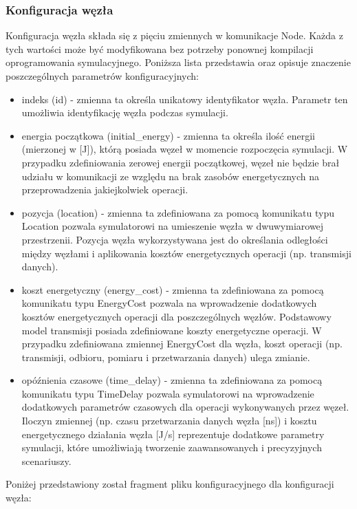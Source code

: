 \documentclass[a4paper,12pt,twoside,openany]{report}
\begin{document}
\subsubsection{Konfiguracja węzła}

Konfiguracja węzła składa się z pięciu zmiennych w komunikacje Node. Każda z tych wartości może być modyfikowana bez potrzeby
ponownej kompilacji oprogramowania symulacyjnego. Poniższa lista przedstawia oraz opisuje znaczenie poszczególnych parametrów konfiguracyjnych:

\begin{itemize}
 \item indeks (id) - zmienna ta określa unikatowy identyfikator węzła. Parametr ten umożliwia identyfikację węzła podczas symulacji.
 \item energia początkowa (initial\_energy) - zmienna ta określa ilość energii (mierzonej w [J]), którą posiada węzeł w momencie rozpoczęcia symulacji.
       W przypadku zdefiniowania zerowej energii początkowej, węzeł nie będzie brał udziału w komunikacji ze względu na brak zasobów energetycznych na
       przeprowadzenia jakiejkolwiek operacji.
 \item pozycja (location) - zmienna ta zdefiniowana za pomocą komunikatu typu Location pozwala symulatorowi na umieszenie węzła w dwuwymiarowej przestrzenii.
       Pozycja węzła wykorzystywana jest do określania odległości między węzłami i aplikowania kosztów energetycznych operacji (np. transmisji danych).
 \item koszt energetyczny (energy\_cost) - zmienna ta zdefiniowana za pomocą komunikatu typu EnergyCost pozwala na wprowadzenie dodatkowych kosztów energetycznych
       operacji dla poszczególnych węzłów. Podstawowy model transmisji posiada zdefiniowane koszty energetyczne operacji.
       W przypadku zdefiniowana zmiennej EnergyCost dla węzła, koszt operacji (np. transmisji, odbioru, pomiaru i przetwarzania danych) ulega zmianie.
 \item opóźnienia czasowe (time\_delay) - zmienna ta zdefiniowana za pomocą komunikatu typu TimeDelay pozwala symulatorowi na wprowadzenie dodatkowych parametrów czasowych
       dla operacji wykonywanych przez węzeł. Iloczyn zmiennej (np. czasu przetwarzania danych węzła [ns]) i kosztu energetycznego działania węzła [J/s] 
       reprezentuje dodatkowe parametry symulacji, które umożliwiają tworzenie zaawansowanych i precyzyjnych scenariuszy.
\end{itemize}

Poniżej przedstawiony został fragment pliku konfiguracyjnego dla konfiguracji węzła:
\end{document}
